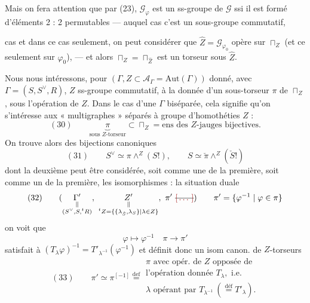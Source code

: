 \documentclass[11pt,a4paper]{article}
\begin{document}
Mais on fera attention que par (23), $\mathcal{G}_{\varphi}$ est un ss-groupe de $\mathcal{G}$ ssi il est formé d'éléments 2 : 2 permutables --- auquel cas c'est un sous-groupe commutatif, 

cas et dans ce cas seulement, on peut considérer que $\hat{Z} = \mathcal{G}_{\varphi_0}$ opère sur $\sqcap_Z$ (et ce seulement sur $\varphi_0$), --- et alors $\sqcap_Z = \sqcap_{\hat{Z}}$ est un torseur sous $\hat{Z}$.

Nous nous intéressons, pour $(\Gamma, Z \subset \mathcal{A}_{\Gamma} = \mathrm{Aut}(\Gamma))$ donné, avec $\Gamma = (S, S^{\vee}, R)$, $Z$ ss-groupe commutatif,  à la donnée d'un sous-torseur $\pi$ de $\sqcap_Z$, sous l'opération de $Z$. Dans le cas d'une $\Gamma$ biséparée, cela signifie qu'on s'intéresse aux « multigraphes » séparés à groupe d'homothéties $Z$ :
\[
(30) \qquad \underbrace{\pi}_{\text{sous $Z$-torseur}} \subset \sqcap_Z = \text{ens des $Z$-jauges bijectives} .
\]
On trouve alors des bijections canoniques
\[
(31) \qquad S^{\vee} \simeq \pi \wedge^{Z} (S!) , \qquad S \simeq \check{\pi} \wedge^{Z} (\check{S}!)
\]
dont la deuxième peut être considérée, soit comme une  de la première, soit comme un  de la première,  les isomorphismes   : la situation duale
\[
(32) \qquad (\underset{\substack{\| \\ (S^{\vee}, S, {}^{t}R)}}{\Gamma'},\ \underset{\substack{\| \\ {}^{t}Z = \{\{\lambda_{\check{S}}, \lambda_S\} \mid \lambda \in Z\}}}{Z'},\ \pi' \text{ \struck{\ill{}}}) \qquad \pi' = \{\varphi^{-1} \mid \varphi \in \pi\}
\]
on voit que
\[
\varphi \longmapsto \varphi^{-1} \quad \pi \longrightarrow \pi'
\]
\struck{\ill{}} satisfait à $(T_{\lambda}\varphi)^{-1} = T'_{\lambda^{-1}}(\varphi^{-1})$ et définit donc un isom canon. de $Z$-torseurs
\[
(33) \qquad \pi' \simeq \pi^{[-1]} \overset{\mathrm{def}}{=}
\begin{array}{l}
\pi \text{ avec opér. de } Z \text{ opposée de} \\
\text{l'opération donnée } T_{\lambda}, \text{ i.e.} \\
\lambda \text{ opérant par } T_{\lambda^{-1}} \ (\overset{\mathrm{déf}}{=} T'_{\lambda}) .
\end{array}
\]
\end{document}
